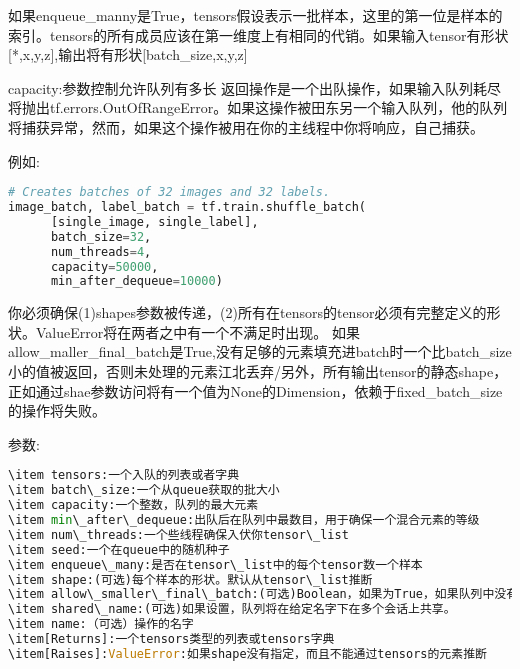 如果enqueue\_manny是True，tensors假设表示一批样本，这里的第一位是样本的索引。tensors的所有成员应该在第一维度上有相同的代销。如果输入tensor有形状[*,x,y,z],输出将有形状[batch\_size,x,y,z]

capacity:参数控制允许队列有多长
返回操作是一个出队操作，如果输入队列耗尽将抛出tf.errors.OutOfRangeError。如果这操作被田东另一个输入队列，他的队列将捕获异常，然而，如果这个操作被用在你的主线程中你将响应，自己捕获。

例如:
\begin{lstlisting}[language=Python]
# Creates batches of 32 images and 32 labels.
image_batch, label_batch = tf.train.shuffle_batch(
      [single_image, single_label],
      batch_size=32,
      num_threads=4,
      capacity=50000,
      min_after_dequeue=10000)
\end{lstlisting}
你必须确保(1)shapes参数被传递，(2)所有在tensors的tensor必须有完整定义的形状。ValueError将在两者之中有一个不满足时出现。
如果allow\_maller\_final\_batch是True,没有足够的元素填充进batch时一个比batch\_size小的值被返回，否则未处理的元素江北丢弃/另外，所有输出tensor的静态shape，正如通过shae参数访问将有一个值为None的Dimension，依赖于fixed\_batch\_size的操作将失败。

参数:
\begin{lstlisting}[language=Python]
\item tensors:一个入队的列表或者字典
\item batch\_size:一个从queue获取的批大小
\item capacity:一个整数，队列的最大元素
\item min\_after\_dequeue:出队后在队列中最数目，用于确保一个混合元素的等级
\item num\_threads:一个些线程确保入伏你tensor\_list
\item seed:一个在queue中的随机种子
\item enqueue\_many:是否在tensor\_list中的每个tensor数一个样本
\item shape:(可选)每个样本的形状。默认从tensor\_list推断
\item allow\_smaller\_final\_batch:(可选)Boolean，如果为True，如果队列中没有足够的元素允许最后的batch变小
\item shared\_name:(可选)如果设置，队列将在给定名字下在多个会话上共享。
\item name:（可选）操作的名字
\item[Returns]:一个tensors类型的列表或tensors字典
\item[Raises]:ValueError:如果shape没有指定，而且不能通过tensors的元素推断
\end{lstlisting}
